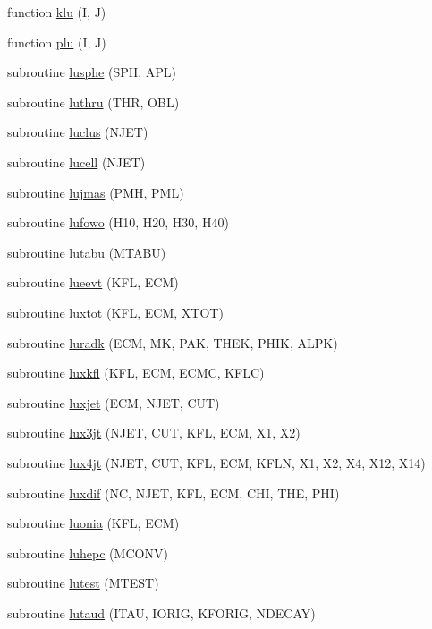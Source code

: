 \begin{DoxyCompactItemize}
function \hyperlink{jetset7409_8f_add1daceddb712a91ab2f9901ae80692f}{klu} (I, J)
\item 
function \hyperlink{jetset7409_8f_ab4b095f080a22e776f5a9cc25e23cc54}{plu} (I, J)
\item 
subroutine \hyperlink{jetset7409_8f_ae14ba0d975a6c3414f4ba28a2120d0e1}{lusphe} (S\+P\+H, A\+P\+L)
\item 
subroutine \hyperlink{jetset7409_8f_a01c2cccfd28fcbfad23fdf0d6d955352}{luthru} (T\+H\+R, O\+B\+L)
\item 
subroutine \hyperlink{jetset7409_8f_a5a451276fe957734030c886bc4f8e814}{luclus} (N\+J\+E\+T)
\item 
subroutine \hyperlink{jetset7409_8f_add8cff69adb0e015427c0f1f8b8f7cd6}{lucell} (N\+J\+E\+T)
\item 
subroutine \hyperlink{jetset7409_8f_a9929cdd809f7d306aab1384aa26896dd}{lujmas} (P\+M\+H, P\+M\+L)
\item 
subroutine \hyperlink{jetset7409_8f_a70bb3b57ab3c403561d2f5f7ed38006c}{lufowo} (H10, H20, H30, H40)
\item 
subroutine \hyperlink{jetset7409_8f_a8395a42e4cd2d6d44338b55b4b2a08b1}{lutabu} (M\+T\+A\+B\+U)
\item 
subroutine \hyperlink{jetset7409_8f_add2076f5ebfddada6c0dddaeb75a4d55}{lueevt} (K\+F\+L, E\+C\+M)
\item 
subroutine \hyperlink{jetset7409_8f_aed6d4231433f40bf5445fe3dc7b94703}{luxtot} (K\+F\+L, E\+C\+M, X\+T\+O\+T)
\item 
subroutine \hyperlink{jetset7409_8f_a685edd0a41124ba2569f60a4f4585cc2}{luradk} (E\+C\+M, M\+K, P\+A\+K, T\+H\+E\+K, P\+H\+I\+K, A\+L\+P\+K)
\item 
subroutine \hyperlink{jetset7409_8f_a5c1cdd9185569769b334e670af014ec9}{luxkfl} (K\+F\+L, E\+C\+M, E\+C\+M\+C, K\+F\+L\+C)
\item 
subroutine \hyperlink{jetset7409_8f_a2fa56de45847b9554a86d38ee8f22cdb}{luxjet} (E\+C\+M, N\+J\+E\+T, C\+U\+T)
\item 
subroutine \hyperlink{jetset7409_8f_ac4e81e489406df9e1371c725c7e33257}{lux3jt} (N\+J\+E\+T, C\+U\+T, K\+F\+L, E\+C\+M, X1, X2)
\item 
subroutine \hyperlink{jetset7409_8f_a4ec86c629d8ef040973034155385dd09}{lux4jt} (N\+J\+E\+T, C\+U\+T, K\+F\+L, E\+C\+M, K\+F\+L\+N, X1, X2, X4, X12, X14)
\item 
subroutine \hyperlink{jetset7409_8f_a38fb2f57dc9ce2f56a98e6484f99c12a}{luxdif} (N\+C, N\+J\+E\+T, K\+F\+L, E\+C\+M, C\+H\+I, T\+H\+E, P\+H\+I)
\item 
subroutine \hyperlink{jetset7409_8f_a88f68ff12848dace3953139dc10ca751}{luonia} (K\+F\+L, E\+C\+M)
\item 
subroutine \hyperlink{jetset7409_8f_a362872565aac7b016cf9c4297e794af9}{luhepc} (M\+C\+O\+N\+V)
\item 
subroutine \hyperlink{jetset7409_8f_af1bc51f2ef657321e77c99f61c52bc07}{lutest} (M\+T\+E\+S\+T)
\item 
subroutine \hyperlink{jetset7409_8f_af2403749427df6b9d871c74fafc5838c}{lutaud} (I\+T\+A\+U, I\+O\+R\+I\+G, K\+F\+O\+R\+I\+G, N\+D\+E\+C\+A\+Y)
\end{DoxyCompactItemize}


